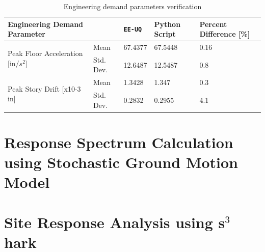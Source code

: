 \begin{table}[hbt!]                 
  \centering
\begin{adjustbox}{max width=\textwidth}            
  \begin{tabular}{lllll}                    
    \toprule          
      Engineering Demand Parameter &	 & \texttt{EE-UQ}	& Python Script	 & Percent Difference [\%]  \\ \hline
    
	\multirow{2}{*}{Peak Floor Acceleration [in/$s^2$]} 
	 & Mean &	67.4377	& 67.5448	& 0.16 \\
      & Std. Dev.	& 12.6487	 & 12.5487	& 0.8 \\ \hline
      
      \multirow{2}{*}{Peak Story Drift [x10-3 in]} 
      & Mean &	1.3428 &	1.347 &	0.3 \\
      & Std. Dev.	& 0.2832 &	0.2955	& 4.1	 \\

      \bottomrule      
                            
  \end{tabular}
\end{adjustbox}
  \caption{Engineering demand parameters verification}             
  \label{tab:edp}                 
\end{table}

\section{Response Spectrum Calculation using Stochastic Ground Motion Model}


\section{Site Response Analysis using s$^3$hark}

